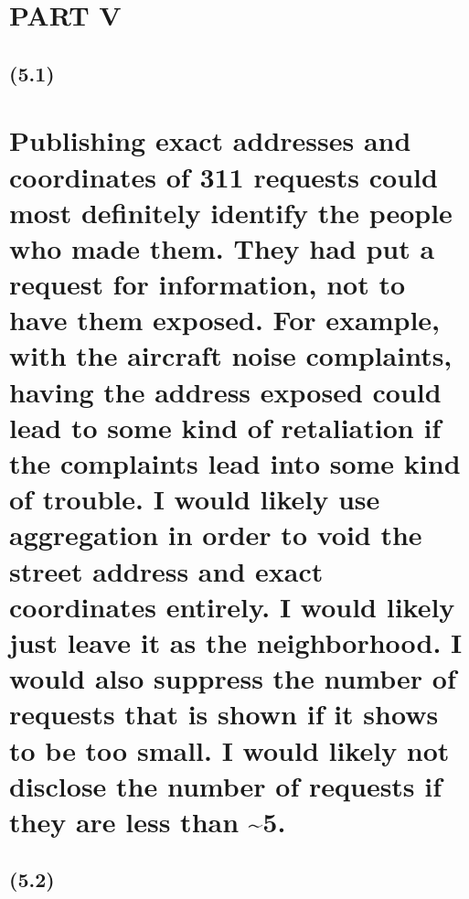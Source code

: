 \documentclass[
]{article}
\begin{document}
\section{PART V}\label{part-v}

\subsection{(5.1)}\label{section-16}

\section{Publishing exact addresses and coordinates of 311 requests
could most definitely identify the people who made them. They had put a
request for information, not to have them exposed. For example, with the
aircraft noise complaints, having the address exposed could lead to some
kind of retaliation if the complaints lead into some kind of trouble. I
would likely use aggregation in order to void the street address and
exact coordinates entirely. I would likely just leave it as the
neighborhood. I would also suppress the number of requests that is shown
if it shows to be too small. I would likely not disclose the number of
requests if they are less than
\textasciitilde5.}\label{publishing-exact-addresses-and-coordinates-of-311-requests-could-most-definitely-identify-the-people-who-made-them.-they-had-put-a-request-for-information-not-to-have-them-exposed.-for-example-with-the-aircraft-noise-complaints-having-the-address-exposed-could-lead-to-some-kind-of-retaliation-if-the-complaints-lead-into-some-kind-of-trouble.-i-would-likely-use-aggregation-in-order-to-void-the-street-address-and-exact-coordinates-entirely.-i-would-likely-just-leave-it-as-the-neighborhood.-i-would-also-suppress-the-number-of-requests-that-is-shown-if-it-shows-to-be-too-small.-i-would-likely-not-disclose-the-number-of-requests-if-they-are-less-than-5.}

\subsection{(5.2)}\label{section-17}
\end{document}
